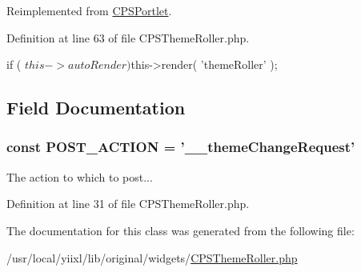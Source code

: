 Reimplemented from \hyperlink{classCPSPortlet_a0d304720b71e3fabb0b602754043e1b6}{CPSPortlet}.



Definition at line 63 of file CPSThemeRoller.php.




\begin{DoxyCode}
    {
        if ( $this->autoRender ) $this->render( 'themeRoller' );
    }
\end{DoxyCode}




\subsection{Field Documentation}
\hypertarget{classCPSThemeRoller_a46bd60d1fdb8d8e8dd828db69155d04b}{
\subsubsection[{POST\_\-ACTION}]{\setlength{\rightskip}{0pt plus 5cm}const {\bf POST\_\-ACTION} = '\_\-\_\-themeChangeRequest'}}
\label{classCPSThemeRoller_a46bd60d1fdb8d8e8dd828db69155d04b}
The action to which to post... 

Definition at line 31 of file CPSThemeRoller.php.



The documentation for this class was generated from the following file:\begin{DoxyCompactItemize}
\item 
/usr/local/yiixl/lib/original/widgets/\hyperlink{CPSThemeRoller_8php}{CPSThemeRoller.php}\end{DoxyCompactItemize}
